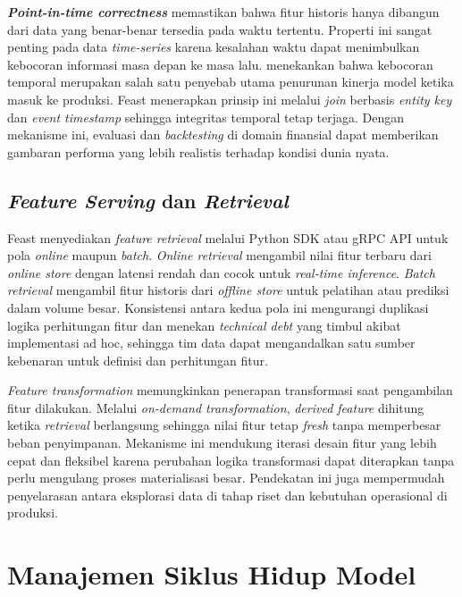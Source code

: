\textbf{\textit{Point-in-time correctness}} memastikan bahwa fitur historis hanya dibangun dari data yang benar-benar tersedia pada waktu tertentu. Properti ini sangat penting pada data \textit{time-series} karena kesalahan waktu dapat menimbulkan kebocoran informasi masa depan ke masa lalu. \textcite{polyzotis2018data} menekankan bahwa kebocoran temporal merupakan salah satu penyebab utama penurunan kinerja model ketika masuk ke produksi. Feast menerapkan prinsip ini melalui \textit{join} berbasis \textit{entity key} dan \textit{event timestamp} sehingga integritas temporal tetap terjaga. Dengan mekanisme ini, evaluasi dan \textit{backtesting} di domain finansial dapat memberikan gambaran performa yang lebih realistis terhadap kondisi dunia nyata.

\subsection{\textit{Feature Serving} dan \textit{Retrieval}}

Feast menyediakan \textit{feature retrieval} melalui Python SDK atau gRPC API untuk pola \textit{online} maupun \textit{batch}. \textit{Online retrieval} mengambil nilai fitur terbaru dari \textit{online store} dengan latensi rendah dan cocok untuk \textit{real-time inference}. \textit{Batch retrieval} mengambil fitur historis dari \textit{offline store} untuk pelatihan atau prediksi dalam volume besar. Konsistensi antara kedua pola ini mengurangi duplikasi logika perhitungan fitur dan menekan \textit{technical debt} yang timbul akibat implementasi ad hoc, sehingga tim data dapat mengandalkan satu sumber kebenaran untuk definisi dan perhitungan fitur.

\textit{Feature transformation} memungkinkan penerapan transformasi saat pengambilan fitur dilakukan. Melalui \textit{on-demand transformation}, \textit{derived feature} dihitung ketika \textit{retrieval} berlangsung sehingga nilai fitur tetap \textit{fresh} tanpa memperbesar beban penyimpanan. Mekanisme ini mendukung iterasi desain fitur yang lebih cepat dan fleksibel karena perubahan logika transformasi dapat diterapkan tanpa perlu mengulang proses materialisasi besar. Pendekatan ini juga mempermudah penyelarasan antara eksplorasi data di tahap riset dan kebutuhan operasional di produksi.

\section{Manajemen Siklus Hidup Model}
\label{sec:model_lifecycle}

